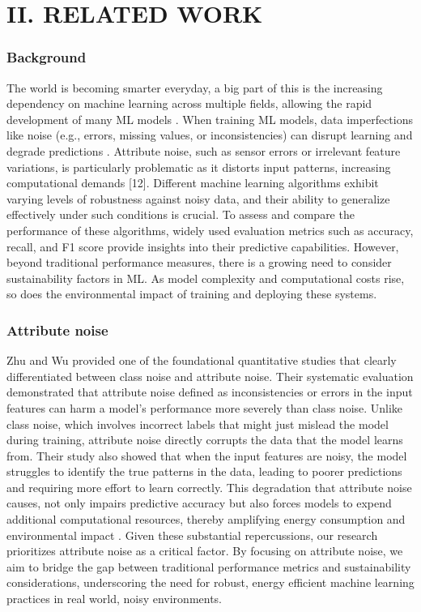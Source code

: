 \documentclass[conference]{IEEEtran}
\begin{document}
\section*{II. RELATED WORK}
\subsubsection*{Background} The world is becoming smarter everyday, a big part of this is the increasing dependency on machine learning across multiple fields, allowing the rapid development of many ML models \cite{bain_ai_sustainability}. When training ML models, data imperfections like noise (e.g., errors, missing values, or inconsistencies) can disrupt learning and degrade predictions \cite{sciencedirect_noise}. Attribute noise, such as sensor errors or irrelevant feature variations, is particularly problematic as it distorts input patterns, increasing computational demands [12]. Different machine learning algorithms exhibit varying levels of robustness against noisy data, and their ability to generalize effectively under such conditions is crucial. To assess and compare the performance of these algorithms, widely used evaluation metrics such as accuracy, recall, and F1 score provide insights into their predictive capabilities. However, beyond traditional performance measures, there is a growing need to consider sustainability factors in ML. As model complexity and computational costs rise, so does the environmental impact of training and deploying these systems. 
\newline
\newline
\subsubsection*{Attribute noise}
Zhu and Wu \cite{wuzu} provided one of the foundational quantitative studies that clearly differentiated between class noise and attribute noise. Their systematic evaluation demonstrated that attribute noise defined as inconsistencies or errors in the input features can harm a model's performance more severely than class noise. Unlike class noise, which involves incorrect labels that might just mislead the model during training, attribute noise directly corrupts the data that the model learns from. Their study also showed that when the input features are noisy, the model struggles to identify the true patterns in the data, leading to poorer predictions and requiring more effort to learn correctly.\newline
\newline
This degradation that attribute noise causes, not only impairs predictive accuracy but also forces models to expend additional computational resources, thereby amplifying energy consumption and environmental impact \cite{wuzu}. Given these substantial repercussions, our research prioritizes attribute noise as a critical factor. By focusing on attribute noise, we aim to bridge the gap between traditional performance metrics and sustainability considerations, underscoring the need for robust, energy efficient machine learning practices in real world, noisy environments.
\end{document}
